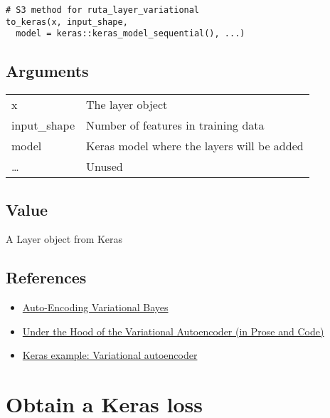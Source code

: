 \begin{verbatim}
# S3 method for ruta_layer_variational
to_keras(x, input_shape,
  model = keras::keras_model_sequential(), ...)
\end{verbatim}

\hypertarget{arguments}{\subsection{\texorpdfstring{\protect\hyperlink{arguments}{}Arguments}{Arguments}}\label{arguments}}

\begin{longtable}[c]{@{}>{\small}p{3cm}>{\raggedright}p{12.5cm}@{}}
\toprule
x & The layer object\tabularnewline
input\_shape & Number of features in training data\tabularnewline
model & Keras model where the layers will be added\tabularnewline
\ldots{} & Unused\tabularnewline
\bottomrule
\end{longtable}

\hypertarget{value}{\subsection{\texorpdfstring{\protect\hyperlink{value}{}Value}{Value}}\label{value}}

A Layer object from Keras

\hypertarget{references}{\subsection{\texorpdfstring{\protect\hyperlink{references}{}References}{References}}\label{references}}

\begin{itemize}
\item
  \href{https://arxiv.org/abs/1312.6114}{Auto-Encoding Variational
  Bayes}
\item
  \href{http://blog.fastforwardlabs.com/2016/08/22/under-the-hood-of-the-variational-autoencoder-in.html}{Under
  the Hood of the Variational Autoencoder (in Prose and Code)}
\item
  \href{https://keras.rstudio.com/articles/examples/variational_autoencoder.html}{Keras
  example: Variational autoencoder}
\end{itemize}

\section{Obtain a Keras loss}\label{obtain-a-keras-loss}

